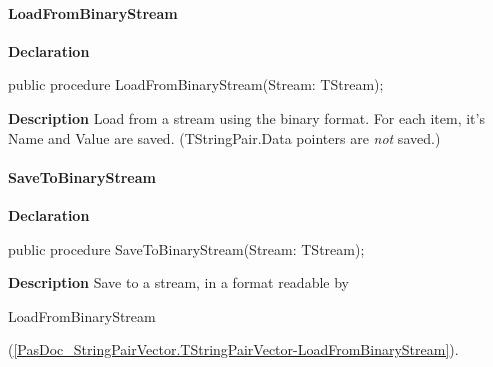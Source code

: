 \documentclass{report}
\newif\ifpdf
\begin{document}
\paragraph*{LoadFromBinaryStream}\hspace*{\fill}

\label{PasDoc_StringPairVector.TStringPairVector-LoadFromBinaryStream}
\begin{list}{}{
\setlength{\itemindent}{0cm}
\setlength{\listparindent}{0cm}
\setlength{\leftmargin}{\evensidemargin}
\addtolength{\leftmargin}{\tmplength}
\settowidth{\labelsep}{X}
\addtolength{\leftmargin}{\labelsep}
\setlength{\labelwidth}{\tmplength}
}
\item[\textbf{Declaration}\hfill]
\ifpdf
\begin{flushleft}
\fi
\begin{ttfamily}
public procedure LoadFromBinaryStream(Stream: TStream);\end{ttfamily}

\ifpdf
\end{flushleft}
\fi

\par
\item[\textbf{Description}]
Load from a stream using the binary format. For each item, it's Name and Value are saved. (TStringPair.Data pointers are \textit{not} saved.)

\end{list}
\paragraph*{SaveToBinaryStream}\hspace*{\fill}

\label{PasDoc_StringPairVector.TStringPairVector-SaveToBinaryStream}
\begin{list}{}{
\setlength{\itemindent}{0cm}
\setlength{\listparindent}{0cm}
\setlength{\leftmargin}{\evensidemargin}
\addtolength{\leftmargin}{\tmplength}
\settowidth{\labelsep}{X}
\addtolength{\leftmargin}{\labelsep}
\setlength{\labelwidth}{\tmplength}
}
\item[\textbf{Declaration}\hfill]
\ifpdf
\begin{flushleft}
\fi
\begin{ttfamily}
public procedure SaveToBinaryStream(Stream: TStream);\end{ttfamily}

\ifpdf
\end{flushleft}
\fi

\par
\item[\textbf{Description}]
Save to a stream, in a format readable by \begin{ttfamily}LoadFromBinaryStream\end{ttfamily}(\ref{PasDoc_StringPairVector.TStringPairVector-LoadFromBinaryStream}).

\end{list}
\end{document}
